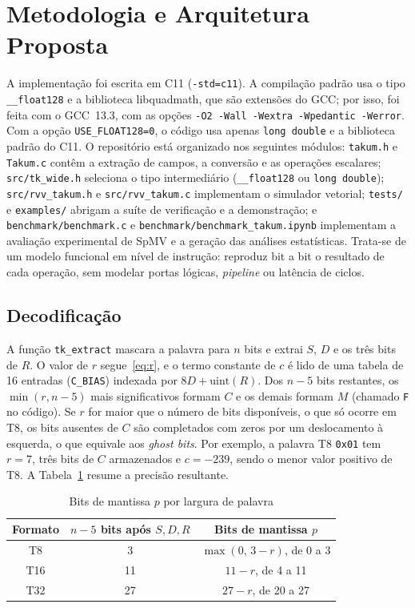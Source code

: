 \documentclass[journal]{IEEEtran}
\begin{document}
\section{Metodologia e Arquitetura Proposta}
\label{sec:metodo}

A implementação foi escrita em C11 (\texttt{-std=c11}). A compilação
padrão usa o tipo \texttt{\_\_float128} e a biblioteca libquadmath, que são
extensões do GCC; por isso, foi feita com o GCC~13.3, com as opções
\texttt{-O2 -Wall -Wextra -Wpedantic -Werror}. Com a opção
\texttt{USE\_FLOAT128=0}, o código usa apenas \texttt{long double} e a
biblioteca padrão do C11. O repositório está organizado nos seguintes módulos:
\texttt{takum.h} e \texttt{Takum.c} contêm a extração de campos, a conversão e
as operações escalares; \texttt{src/tk\_wide.h} seleciona o tipo intermediário
(\texttt{\_\_float128} ou \texttt{long double}); \texttt{src/rvv\_takum.h} e
\texttt{src/rvv\_takum.c} implementam o simulador vetorial; \texttt{tests/} e
\texttt{examples/} abrigam a suíte de verificação e a demonstração; e
\texttt{benchmark/benchmark.c} e \texttt{benchmark/benchmark\_takum.ipynb}
implementam a avaliação experimental de SpMV e a geração das análises
estatísticas. Trata-se de um modelo funcional em nível de instrução: reproduz
bit a bit o resultado de cada operação, sem modelar portas lógicas,
\emph{pipeline} ou latência de ciclos.

\subsection{Decodificação}
A função \texttt{tk\_extract} mascara a palavra para $n$ bits e extrai $S$,
$D$ e os três bits de $R$. O valor de $r$ segue~\eqref{eq:r}, e o termo
constante de $c$ é lido de uma tabela de 16 entradas (\texttt{C\_BIAS}) indexada por
$8D+\mathrm{uint}(R)$. Dos $n-5$ bits restantes, os $\min(r, n-5)$ mais
significativos formam $C$ e os demais formam $M$ (chamado \texttt{F} no código). Se $r$ for maior que o número de bits
disponíveis, o que só ocorre em T8, os bits ausentes de $C$ são completados
com zeros por um deslocamento à esquerda, o que equivale aos \emph{ghost
bits}. Por exemplo, a palavra T8 \texttt{0x01} tem $r=7$, três bits de $C$
armazenados e $c=-239$, sendo o menor valor positivo de T8. A
Tabela~\ref{tab:p} resume a precisão resultante.

\begin{table}[!t]
\renewcommand{\arraystretch}{1.15}
\caption{Bits de mantissa $p$ por largura de palavra}
\label{tab:p}
\centering
\begin{tabular}{c c c}
\hline
Formato & $n-5$ bits após $S,D,R$ & Bits de mantissa $p$ \\
\hline
T8  & 3  & $\max(0,\,3-r)$, de 0 a 3 \\
T16 & 11 & $11-r$, de 4 a 11 \\
T32 & 27 & $27-r$, de 20 a 27 \\
\hline
\end{tabular}
\end{table}
\end{document}
